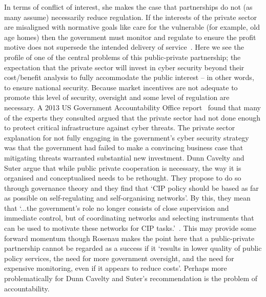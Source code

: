 \documentclass[a4paper,11pt]{article}
\begin{document}
In terms of conflict of interest, she makes the case that partnerships
do not (as many assume) necessarily reduce regulation. If the
interests of the private sector are misaligned with normative goals
like care for the vulnerable (for example, old age homes) then the
government must monitor and regulate to ensure the profit motive does
not supersede the intended delivery of service~\cite{rosenau:1999}.
Here we see the profile of one of the central problems of this
public-private partnership; the expectation that the private sector
will invest in cyber security beyond their cost/benefit analysis to
fully accommodate the public interest -- in other words, to ensure
national security. Because market incentives are not adequate to
promote this level of security, oversight and some level of regulation
are necessary. A 2013 US Government Accountability Office
report~\cite{usgao:2013} found that many of the experts they consulted
argued that the private sector had not done enough to protect critical
infrastructure against cyber threats. The private sector explanation
for not fully engaging in the government's cyber security strategy was
that the government had failed to make a convincing business case that
mitigating threats warranted substantial new investment.  Dunn Cavelty
and Suter argue that while public private cooperation is necessary,
the way it is organised and conceptualised needs to be rethought. They
propose to do so through governance theory and they find that `CIP
policy should be based as far as possible on self-regulating and
self-organising networks'. By this, they mean that `...the
government's role no longer consists of close supervision and
immediate control, but of coordinating networks and selecting
instruments that can be used to motivate these networks for CIP
tasks.'~\cite{dunncavelty+suter:2009}. This may provide some forward
momentum though Rosenau makes the point here that a
public-private partnership cannot be regarded as a success if it
`results in lower quality of public policy services, the need for more
government oversight, and the need for expensive monitoring, even if
it appears to reduce costs'. Perhaps more problematically for Dunn
Cavelty and Suter's recommendation is the problem of accountability.
\end{document}
